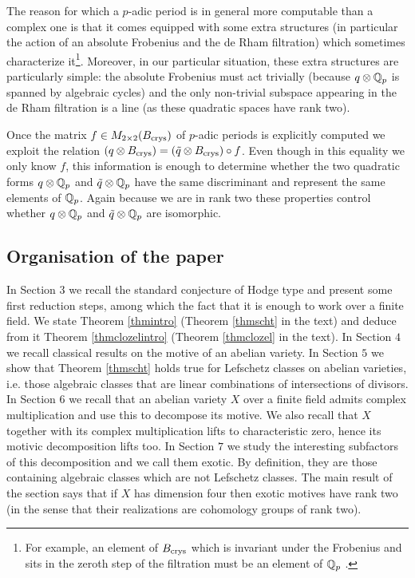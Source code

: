 \documentclass[11pt]{amsart}
\begin{document}
The reason for which  a $p$-adic period is in general more computable than a complex one is that it comes equipped with some extra structures (in particular the action of an absolute Frobenius and the de Rham filtration) which sometimes characterize it\footnote{For example, an element of $B_{\textnormal{crys}}$ which is invariant under the Frobenius and sits in the zeroth step  of the filtration must be an element of $\mathbb{Q}_p$  \cite[Theorem 5.3.7]{Fontp}.}. Moreover, in our particular situation, these extra structures are particularly simple: the absolute Frobenius must act trivially (because $q\otimes \mathbb{Q}_p$ is spanned by algebraic cycles) and the only non-trivial subspace appearing in the de Rham filtration is a line (as these quadratic spaces have rank two).

Once   the matrix $f \in M_{2 \times 2} (B_{\textnormal{crys}})$ of $p$-adic periods is explicitly computed we exploit the relation $(q\otimes B_{\textnormal{crys}})=  (\tilde{q}\otimes B_{\textnormal{crys}}) \circ f$. Even though in this equality we only know $f$, this information is enough to determine whether the two quadratic forms  $q\otimes \mathbb{Q}_p$ and $\tilde{q}\otimes \mathbb{Q}_p$ have the same discriminant and represent the same elements of $\mathbb{Q}_p$. Again because we are in rank two these properties control whether  $q\otimes \mathbb{Q}_p$ and $\tilde{q}\otimes \mathbb{Q}_p$ are isomorphic.


\subsection*{Organisation of the paper}
In Section $3$ we recall the standard conjecture of Hodge type and present some first reduction steps, among which the fact that it is enough to work over a finite field. We state Theorem \ref{thmintro} (Theorem \ref{thmscht} in the text) and deduce from it Theorem \ref{thmclozelintro} (Theorem \ref{thmclozel} in the text). In Section $4$ we recall classical results on the motive of an abelian variety. In Section $5$ we show that Theorem \ref{thmscht} holds true for Lefschetz classes on abelian varieties, i.e. those algebraic classes that are linear combinations of intersections of divisors. In Section $6$ we recall that an abelian variety $X$ over a finite field admits complex multiplication and use this to decompose its   motive. We also recall that $X$ together with its complex multiplication lifts to characteristic zero, hence its motivic decomposition lifts too. In Section $7$ we study the interesting subfactors of this decomposition and we call them exotic. By definition, they are those containing algebraic classes which are not Lefschetz classes. The main result of the section says that if $X$ has dimension four then exotic motives have rank two (in the sense that their realizations are cohomology groups of rank two).
\end{document}
